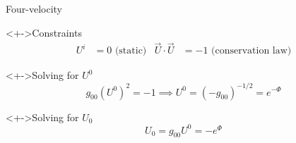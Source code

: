 \documentclass{beamer}
\let\svthefootnote\thefootnote
\newcommand\blankfootnote[1]{%
  \let\thefootnote\relax\footnotetext{#1}%
  \let\thefootnote\svthefootnote%
}
\begin{document}
\begin{frame}{Four-velocity}

\begin{block}<+->{Constraints}
\begin{align*}
  U^i &= 0
  \text{ (static)}
  &
  \vec{U} \cdot \vec{U} &= -1
  \text{ (conservation law)}
\end{align*}
\end{block}

\begin{block}<+->{Solving for $U^0$}
\begin{displaymath}
  g_{00} (U^0)^2 = -1 \implies
  U^0 = (-g_{00})^{-1/2} = e^{-\Phi}
\end{displaymath}
\end{block}

\begin{block}<+->{Solving for $U_0$}
\begin{displaymath}
  U_0 = g_{00} U^0 = -e^{\Phi}
\end{displaymath}
\end{block}

\blankfootnote{\textcite[p. 260]{Schutz}}



\end{frame}

\end{document}
